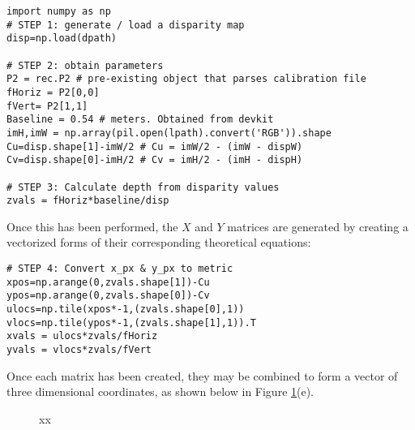 \begin{lstlisting}
import numpy as np
# STEP 1: generate / load a disparity map
disp=np.load(dpath)

# STEP 2: obtain parameters
P2 = rec.P2 # pre-existing object that parses calibration file
fHoriz = P2[0,0]
fVert= P2[1,1]
Baseline = 0.54 # meters. Obtained from devkit
imH,imW = np.array(pil.open(lpath).convert('RGB')).shape
Cu=disp.shape[1]-imW/2 # Cu = imW/2 - (imW - dispW)
Cv=disp.shape[0]-imH/2 # Cv = imH/2 - (imH - dispH)

# STEP 3: Calculate depth from disparity values
zvals = fHoriz*baseline/disp
\end{lstlisting}

Once this has been performed, the $X$ and $Y$ matrices are generated by creating a vectorized forms of their corresponding theoretical equations: 
\begin{lstlisting}
# STEP 4: Convert x_px & y_px to metric
xpos=np.arange(0,zvals.shape[1])-Cu
ypos=np.arange(0,zvals.shape[0])-Cv
ulocs=np.tile(xpos*-1,(zvals.shape[0],1))
vlocs=np.tile(ypos*-1,(zvals.shape[1],1)).T
xvals = ulocs*zvals/fHoriz
yvals = vlocs*zvals/fVert
\end{lstlisting}

Once each matrix has been created, they may be combined to form a vector of three dimensional coordinates, as shown below in Figure \ref{reconstruction}(e). 

\begin{figure}[H]
    \centering
    \caption{xx} %
    \label{reconstruction}
\end{figure}






\newpage
